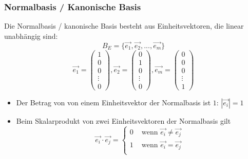 \subsubsection{Normalbasis / Kanonische Basis}
Die Normalbasis / kanonische Basis besteht aus Einheitsvektoren, die
linear unabhängig sind:
\[ B_E = \{ \vec{e_1}, \vec{e_2}, ..., \vec{e_m}\} \]
\[
  \vec{e_1} = \begin {pmatrix} 1 \\ 0 \\ 0 \\ \vdots \\ 0 \end {pmatrix}, 
  \vec{e_2} = \begin {pmatrix} 0 \\ 1 \\ 0 \\ \vdots \\ 0 \end {pmatrix}, 
  \vec{e_m} = \begin {pmatrix} 0 \\ 0 \\ 0 \\ \vdots \\ 1 \end {pmatrix}
\]
\begin{itemize}
  \item Der Betrag von von einem Einheitsvektor der Normalbasis ist $1$:
    $|\vec{e_i}| = 1$
  \item Beim Skalarprodukt von zwei Einheitsvektoren der Normalbasis
    gilt
    \[ \vec{e_i} \cdot \vec{e_j} = 
       \begin{cases}
         0 & \text{ wenn } \vec{e_i} \ne \vec{e_j} \\
         1 & \text{ wenn } \vec{e_i} = \vec{e_j} \\
       \end{cases}
    \]
\end{itemize}


